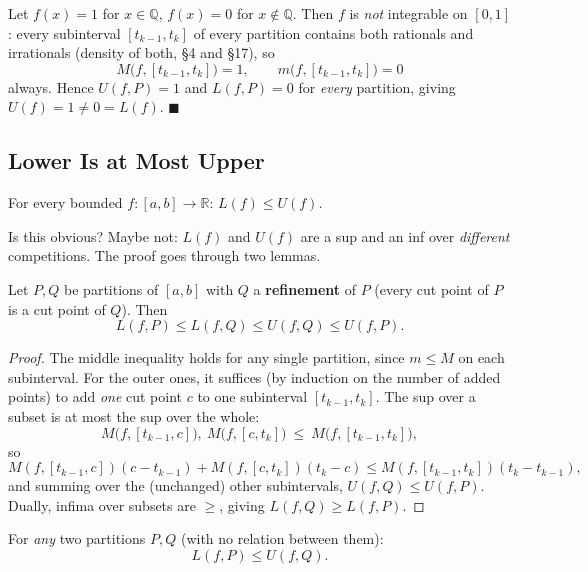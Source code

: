 \documentclass[11pt]{report}
\begin{document}
\begin{exbox}
Let $f(x) = 1$ for $x \in \mathbb{Q}$, $f(x) = 0$ for $x \notin \mathbb{Q}$. Then $f$ is \emph{not} integrable on $[0,1]$: every subinterval $[t_{k-1}, t_k]$ of every partition contains both rationals and irrationals (density of both, \S 4 and \S 17), so
\[
M\bigl(f, [t_{k-1},t_k]\bigr) = 1, \qquad m\bigl(f, [t_{k-1},t_k]\bigr) = 0
\]
always. Hence $U(f,P) = 1$ and $L(f,P) = 0$ for \emph{every} partition, giving $U(f) = 1 \neq 0 = L(f)$. \hfill $\blacksquare$
\end{exbox}

\subsection{Lower Is at Most Upper}

\begin{thmbox}
For every bounded $f: [a,b] \to \mathbb{R}$: \quad $L(f) \leq U(f)$.
\end{thmbox}

Is this obvious? Maybe not: $L(f)$ and $U(f)$ are a sup and an inf over \emph{different} competitions. The proof goes through two lemmas.

\begin{lembox}
Let $P, Q$ be partitions of $[a,b]$ with $Q$ a \textbf{refinement} of $P$ (every cut point of $P$ is a cut point of $Q$). Then
\[
L(f, P) \leq L(f, Q) \leq U(f, Q) \leq U(f, P).
\]
\end{lembox}

\begin{proof}
The middle inequality holds for any single partition, since $m \leq M$ on each subinterval. For the outer ones, it suffices (by induction on the number of added points) to add \emph{one} cut point $c$ to one subinterval $[t_{k-1}, t_k]$. The sup over a subset is at most the sup over the whole:
\[
M\bigl(f, [t_{k-1}, c]\bigr),\ M\bigl(f, [c, t_k]\bigr) \ \leq\ M\bigl(f, [t_{k-1}, t_k]\bigr),
\]
so
\[
M(f,[t_{k-1},c])(c - t_{k-1}) + M(f,[c,t_k])(t_k - c) \leq M(f,[t_{k-1},t_k])(t_k - t_{k-1}),
\]
and summing over the (unchanged) other subintervals, $U(f,Q) \leq U(f,P)$. Dually, infima over subsets are $\geq$, giving $L(f,Q) \geq L(f,P)$.
\end{proof}

\begin{lembox}
For \emph{any} two partitions $P, Q$ (with no relation between them):
\[
L(f, P) \leq U(f, Q).
\]
\end{lembox}
\end{document}

